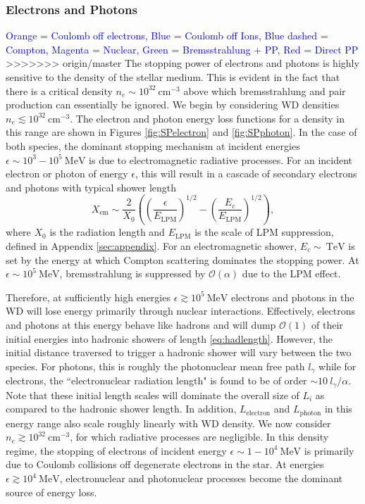 \documentclass[twocolumn,showpacs,preprintnumbers,amsmath,amssymb,prd]{revtex4}
\newcommand{\OO}{\mathcal{O}}
\def\r{\right)}
\def\l{\left(}
\begin{document}
\subsubsection{Electrons and Photons}
\textcolor{blue}{Orange = Coulomb off electrons, Blue = Coulomb off Ions, Blue dashed = Compton, Magenta = Nuclear, Green = Bremsstrahlung + PP, Red = Direct PP}
>>>>>>> origin/master
The stopping power of electrons and photons is highly sensitive to the density of the stellar medium.
This is evident in the fact that there is a critical density $n_e \sim 10^{32} ~\text{cm}^{-3}$ above which bremsstrahlung and pair production can essentially be ignored.
We begin by considering WD densities $n_e \lesssim 10^{32} ~\text{cm}^{-3}$.
The electron and photon energy loss functions for a density in this range are shown in Figures \ref{fig:SPelectron} and \ref{fig:SPphoton}.
In the case of both species, the dominant stopping mechanism at incident energies $\epsilon \sim 10^{3}-10^{5} ~\text{MeV}$ is due to electromagnetic radiative processes.
For an incident electron or photon of energy $\epsilon$, this will result in a cascade of secondary electrons and photons with typical shower length
\begin{equation}
X_\text{em} \sim \frac{2}{X_0} \l \l \frac{\epsilon}{E_\text{LPM}}\r^{1/2} - \l \frac{E_c}{E_\text{LPM}}\r^{1/2} \r,
\end{equation}
where $X_0$ is the radiation length and $E_\text{LPM}$ is the scale of LPM suppression, defined in Appendix \ref{sec:appendix}.
For an electromagnetic shower, $E_c \sim ~\text{TeV}$ is set by the energy at which Compton scattering dominates the stopping power.
At $\epsilon \sim 10^{5} ~\text{MeV}$, bremsstrahlung is suppressed by $\OO(\alpha)$ due to the LPM effect.

Therefore, at sufficiently high energies $\epsilon \gtrsim 10^5 ~\text{MeV}$ electrons and photons in the WD will lose energy primarily through nuclear interactions.
Effectively, electrons and photons at this energy behave like hadrons and will dump $\OO(1)$ of their initial energies into hadronic showers of length \eqref{eq:hadlength}.
However, the initial distance traversed to trigger a hadronic shower will vary between the two species.
For photons, this is roughly the photonuclear mean free path $l_\gamma$ while for electrons, the ``electronuclear radiation length" is found to be of order $\sim 10  ~l_\gamma/\alpha$.
Note that these initial length scales will dominate the overall size of $L_i$ as compared to the hadronic shower length.
In addition, $L_\text{electron}$ and $L_\text{photon}$ in this energy range also scale roughly linearly with WD density.
We now consider $n_e \gtrsim 10^{32} ~\text{cm}^{-3}$, for which radiative processes are negligible.
In this density regime, the stopping of electrons of incident energy $\epsilon \sim 1 - 10^4 ~\text{MeV}$ is primarily due to Coulomb collisions off degenerate electrons in the star.
At energies $\epsilon \gtrsim 10^4 ~\text{MeV}$, electronuclear and photonuclear processes become the dominant source of energy loss.
\end{document}
